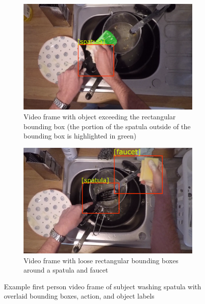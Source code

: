 \documentclass[12pt]{report}
\begin{document}
\begin{figure}[t]
\begin{subfigure}{.5\textwidth}
\centerline{\includegraphics[width=.95\textwidth]{figure/frame_4527_cropped.png}}
\caption{Video frame with object exceeding the rectangular bounding box (the portion of the spatula outside of the bounding box is highlighted in green)}
\label{sampleA}
\end{subfigure}
\begin{subfigure}{.5\textwidth}
\centerline{\includegraphics[width=.95\textwidth]{figure/frame_4085_cropped.png}}
\caption{Video frame with loose rectangular bounding boxes around a spatula and faucet \\ }
\label{sampleB}
\end{subfigure}
\caption{Example first person video frame of subject washing spatula with overlaid bounding boxes, action, and object labels}
\label{sampleFrame}
\end{figure}
\end{document}

